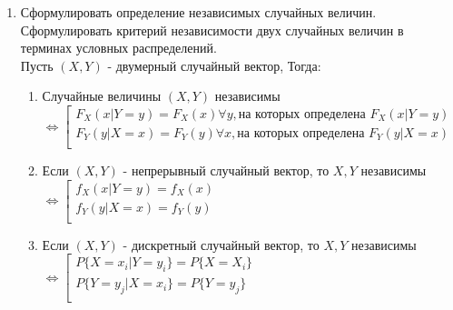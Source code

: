 \documentclass[a4paper]{article}
\begin{document}
\begin{enumerate}
\item[9.] Сформулировать определение независимых случайных величин. Сформулировать критерий независимости двух случайных величин в терминах условных распределений. \\
Пусть $(X,Y)$ - двумерный случайный вектор, Тогда: \\
\begin{enumerate}
\item[1.] Случайные величины $(X,Y)$ независимы $\Leftrightarrow \left[
\begin{array}{lll}
	F_X(x|Y = y) = F_X(x) \forall y, \text{на которых определена } F_X(x|Y = y) \\
	F_Y(y|X = x) = F_Y(y) \forall x, \text{на которых определена } F_Y(y|X = x) \\
\end{array} \right.$ 
\item[2.] Если $(X,Y)$ - непрерывный случайный вектор, то $X,Y$ независимы $\Leftrightarrow \left[
\begin{array}{lll}
	f_X(x|Y = y) = f_X(x) \\
	f_Y(y|X = x) = f_Y(y) \\
\end{array} \right.$
\item[3.] Если $(X,Y)$ - дискретный случайный вектор, то $X,Y$ независимы $\Leftrightarrow \left[
\begin{array}{lll}
	P\{X = x_i|Y = y_i\} = P\{X = X_i\} \\
	P\{Y = y_j|X = x_i\} = P\{Y = y_j\} \\
\end{array} \right.$
\end{enumerate}



\end{enumerate}
\end{document}
